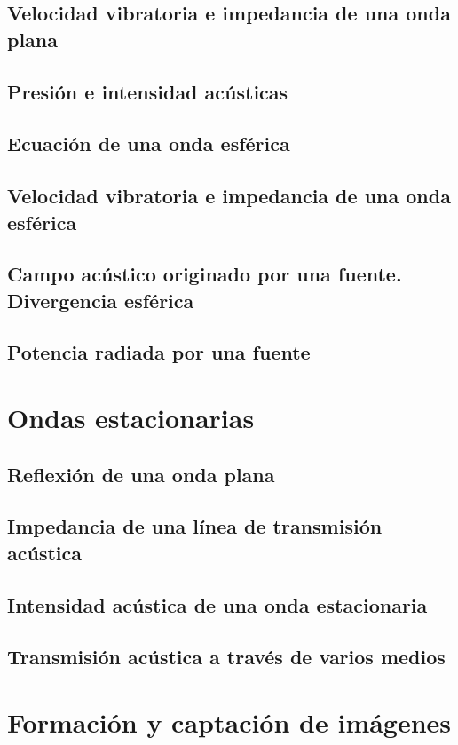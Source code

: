\documentclass[a4paper]{book}
\begin{document}
\section{Velocidad vibratoria e impedancia de una onda plana}
\section{Presión e intensidad acústicas}
\section{Ecuación de una onda esférica}
\section[Velocidad vibratoria e impedancia de una onda esférica]{Velocidad vibratoria e impedancia de una onda\\ esférica}
\section{Campo acústico originado por una fuente. Divergencia esférica}
\section{Potencia radiada por una fuente}

\chapter{Ondas estacionarias}
\section{Reflexión de una onda plana}
\section{Impedancia de una línea de transmisión acústica}
\section{Intensidad acústica de una onda estacionaria}
\section{Transmisión acústica a través de varios medios}

\chapter{Formación y captación de imágenes}
\end{document}
